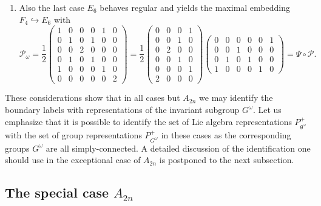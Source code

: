 \documentclass[12pt,a4paper]{article}
\newcommand{\proj}{\mc{P}_{\!\!\omega}}
\newcommand{\embin}{{\hookrightarrow}}
\newcommand{\smat}{\begin{smallmatrix}}
\newcommand{\stam}{\end{smallmatrix}}
\newcommand{\mf}{\mathfrak} %
\newcommand{\mc}{\mathcal} %
\def\Iso{\Psi}
\def\iG{G^\omega} %
\def\ig{\mf{g}^\omega} %
\begin{document}
\begin{appendix}
\begin{enumerate}
\item Also the last case $E_6$ behaves regular and yields the maximal
  embedding $F_4\embin E_6$ with
\[
  \proj
  =\frac{1}{2}\left(\smat1&0&0&0&1&0\\0&1&0&1&0&0\\0&0&2&0&0&0\\0&1&0&1&0&0\\1&0&0&0&1&0\\0&0&0&0&0&2\stam\right)
  =\frac{1}{2}\left(\smat0&0&0&1\\0&0&1&0\\0&2&0&0\\0&0&1&0\\0&0&0&1\\2&0&0&0\stam\right)\left(\smat0&0&0&0&0&1\\0&0&1&0&0&0\\0&1&0&1&0&0\\1&0&0&0&1&0\stam\right)
  =\Iso\circ\mc{P}.
\]
\end{enumerate}

  These considerations show that in all cases but $A_{2n}$ we may identify
  the boundary labels with representations of the invariant subgroup $\iG$.
  Let us emphasize that it is possible to identify the set of Lie algebra
  representations $P_{\ig}^+$ with the set of group representations $P_{\iG}^+$
  in these cases as the corresponding groups $\iG$ are all simply-connected.
  A detailed discussion of the identification one should use in the
  exceptional case of $A_{2n}$ is postponed to the next subsection.

\subsection{The special case $A_{2n}$}


\end{appendix}
\end{document}
